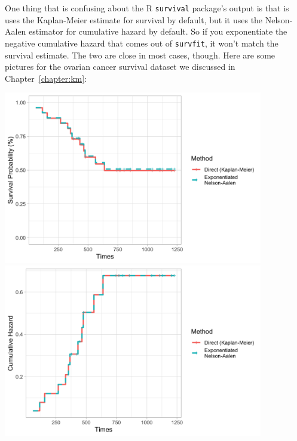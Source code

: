 One thing that is confusing about the R \texttt{survival} package's output is that is uses the Kaplan-Meier estimate for survival by default, but it uses the Nelson-Aalen estimator for cumulative hazard by default. So if you exponentiate the negative cumulative hazard that comes out of \texttt{survfit}, it won't match the survival estimate. The two are close in most cases, though. Here are some pictures for the ovarian cancer survival dataset we discussed in Chapter~\ref{chapter:km}:

\begin{center}
\includegraphics[width=0.85\textwidth]{img/ovarian-overall-survival.png}\\[3mm]
\includegraphics[width=0.85\textwidth]{img/ovarian-overall-cumhaz.png}
\end{center}


